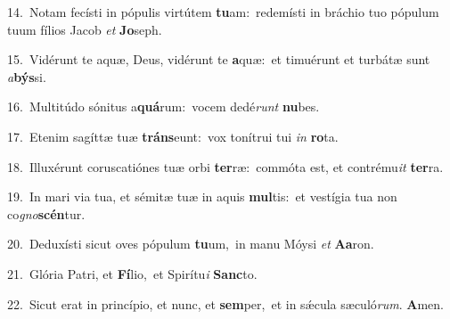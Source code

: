 {\numbfont\textcolor{\numbcolor}{14.}}~Notam fecísti in pópulis virtútem \textbf{tu}\-am:~\star redemísti in bráchio tuo pópulum tuum fílios Jacob \textit{et} \textbf{Jo}\-seph.\par
{\numbfont\textcolor{\numbcolor}{15.}}~Vidérunt te aquæ, Deus, vidérunt te \textbf{a}\-quæ:~\star et timuérunt et turbátæ sunt \textit{a}\-\textbf{býs}si.\par
{\numbfont\textcolor{\numbcolor}{16.}}~Multitúdo sónitus a\-\textbf{quá}\-rum:~\star vocem dedé\textit{runt} \textbf{nu}\-bes.\par
{\numbfont\textcolor{\numbcolor}{17.}}~Etenim sagíttæ tuæ \textbf{tráns}\-eunt:~\star vox tonítrui tui \textit{in} \textbf{ro}\-ta.\par
{\numbfont\textcolor{\numbcolor}{18.}}~Illuxérunt coruscatiónes tuæ orbi \textbf{ter}\-ræ:~\star commóta est, et contrému\textit{it} \textbf{ter}\-ra.\par
{\numbfont\textcolor{\numbcolor}{19.}}~In mari via tua, et sémitæ tuæ in aquis \textbf{mul}\-tis:~\star et vestígia tua non co\-\textit{gno}\-\textbf{scén}tur.\par
{\numbfont\textcolor{\numbcolor}{20.}}~Deduxísti sicut oves pópulum \textbf{tu}\-um,~\star in manu Móysi \textit{et} \textbf{A}\-\textbf{a}ron.\par
{\numbfont\textcolor{\numbcolor}{21.}}~Glória Patri, et \textbf{Fí}\-lio,~\star et Spirítu\textit{i} \textbf{Sanc}\-to.\par
{\numbfont\textcolor{\numbcolor}{22.}}~Sicut erat in princípio, et nunc, et \textbf{sem}\-per,~\star et in sǽcula sæculó\-\textit{rum}\-. \textbf{A}\-men.\par

